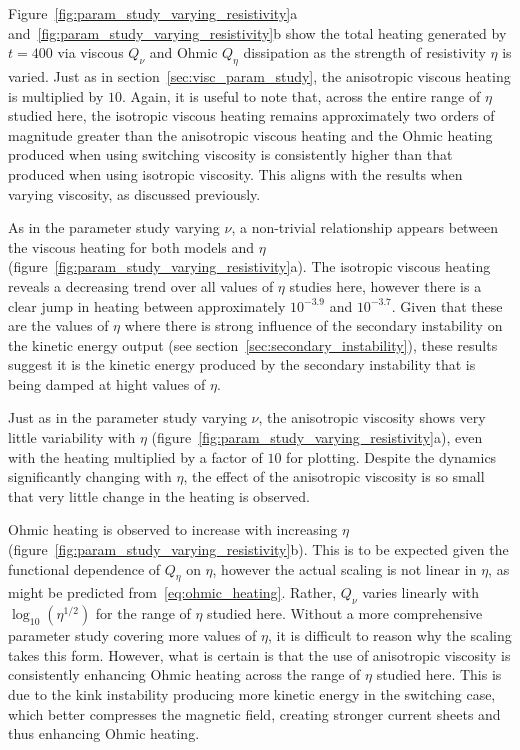 Figure~\ref{fig:param_study_varying_resistivity}a and~\ref{fig:param_study_varying_resistivity}b show the total heating generated by $t=400$ via viscous $Q_{\nu}$ and Ohmic $Q_{\eta}$ dissipation as the strength of resistivity $\eta$ is varied. Just as in section~\ref{sec:visc_param_study}, the anisotropic viscous heating is multiplied by $10$. Again, it is useful to note that, across the entire range of $\eta$ studied here, the isotropic viscous heating remains approximately two orders of magnitude greater than the anisotropic viscous heating and the Ohmic heating produced when using switching viscosity is consistently higher than that produced when using isotropic viscosity. This aligns with the results when varying viscosity, as discussed previously.

As in the parameter study varying $\nu$, a non-trivial relationship appears between the viscous heating for both models and $\eta$ (figure~\ref{fig:param_study_varying_resistivity}a). The isotropic viscous heating reveals a decreasing trend over all values of $\eta$ studies here, however there is a clear jump in heating between approximately $10^{-3.9}$ and $10^{-3.7}$. Given that these are the values of $\eta$ where there is strong influence of the secondary instability on the kinetic energy output (see section~\ref{sec:secondary_instability}), these results suggest it is the kinetic energy produced by the secondary instability that is being damped at hight values of $\eta$.

Just as in the parameter study varying $\nu$, the anisotropic viscosity shows very little variability with $\eta$ (figure~\ref{fig:param_study_varying_resistivity}a), even with the heating multiplied by a factor of $10$ for plotting. Despite the dynamics significantly changing with $\eta$, the effect of the anisotropic viscosity is so small that very little change in the heating is observed.

Ohmic heating is observed to increase with increasing $\eta$ (figure~\ref{fig:param_study_varying_resistivity}b). This is to be expected given the functional dependence of $Q_{\eta}$ on $\eta$, however the actual scaling is not linear in $\eta$, as might be predicted from~\eqref{eq:ohmic_heating}. Rather, $Q_{\nu}$ varies linearly with $\log_{10}(\eta^{1/2})$ for the range of $\eta$ studied here. Without a more comprehensive parameter study covering more values of $\eta$, it is difficult to reason why the scaling takes this form. However, what is certain is that the use of anisotropic viscosity is consistently enhancing Ohmic heating across the range of $\eta$ studied here. This is due to the kink instability producing more kinetic energy in the switching case, which better compresses the magnetic field, creating stronger current sheets and thus enhancing Ohmic heating.

